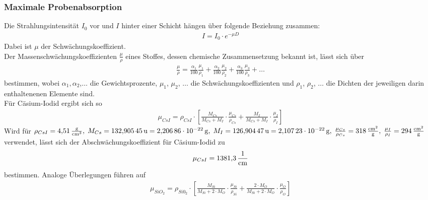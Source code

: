 \documentclass[a4paper,twoside,final]{article}
\begin{document}
\subsubsection{Maximale Probenabsorption}\label{sec:Probenabsorption}

Die Strahlungsintensität $I_0$ vor und $I$ hinter einer Schicht hängen über folgende Beziehung zusammen:
\begin{align}\label{equ:Probenabsorption}
  I = I_0 \cdot e^{-\mu D}
\end{align}
Dabei ist $\mu$ der Schwächungskoeffizient. \\
Der Massenschwächungskoeffizienten $\frac{\mu}{\rho}$ eines Stoffes, dessen chemische Zusammensetzung bekannt ist, lässt sich über
\begin{align}
  \frac{\mu}{\rho} = \frac{\alpha_1}{100}\frac{\mu_1}{\rho_1}+\frac{\alpha_2}{100}\frac{\mu_2}{\rho_2}+\frac{\alpha_3}{100}\frac{\mu_3}{\rho_3}+\hdots
\end{align}
bestimmen, wobei $\alpha_1, \alpha_2$,$\hdots$ die Gewichtsprozente, $\mu_1$, $\mu_2$, $\hdots$ die Schwächungskoeffizienten und $\rho_1$, $\rho_2$, $\hdots$  die Dichten der jeweiligen darin enthaltenenen Elemente sind. \cite{Glocker}\\
Für Cäsium-Iodid ergibt sich so
\begin{align}
  \mu_{CsI} = \rho_{CsI} \cdot \left[\frac{M_{Cs}}{M_{Cs}+M_{I}}\cdot \frac{\mu_{Cs}}{\rho_{Cs}}+\frac{M_{I}}{M_{Cs}+M_I}\cdot \frac{\mu_I}{\rho_I}\right]
\end{align}
Wird für $\rho_{CsI} = \SI{4,51}{\frac{\gram}{\centi\meter\cubed}},\; M_{Cs} = \SI{132,90545}{\text{u}}=\SI{2,20686E-22}{\gram},\; M_{I} = \SI{126,90447}{\text{u}}=\SI{2,10723E-22}{\gram},\; \frac{\mu_{Cs}}{\rho_{Cs}} = \SI{318}{\frac{\centi\meter\squared}{\gram}}, \;\frac{\mu_{I}}{\rho_{I}} = \SI{294}{\frac{\centi\meter\squared}{\gram}} $
verwendet, lässt sich der Abschwächungskoeffizient für Cäsium-Iodid zu
\begin{align}\label{equ:mü_CSI}
\mu_{CsI}= \SI{1381,3}{\frac{1}{\centi\meter}}
\end{align}
bestimmen.
Analoge Überlegungen führen auf
\begin{align}
  \mu_{SiO_2} = \rho_{Si0_2} \cdot \left[\frac{M_{Si}}{M_{Si}+2\cdot M_{O}}\cdot \frac{\mu_{Si}}{\rho_{Si}}+\frac{2\cdot M_{O}}{M_{Si}+2\cdot M_O}\cdot \frac{\mu_O}{\rho_O}\right]
\end{align}
\end{document}
